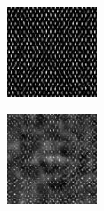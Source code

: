 \documentclass{article}
\begin{document}
\begin{figure}[h!]
\begin{subfigure}[b]{0.1\textwidth}
    \end{subfigure}
    \hspace{-1\baselineskip}
    \quad
    \begin{subfigure}[b]{0.1\textwidth}   
        \centering 
        \includegraphics[width=\textwidth]{plots/D_log_SE2_template.jpg}

    \end{subfigure}
    \hspace{-1\baselineskip}
    \quad
    \begin{subfigure}[b]{0.1\textwidth}   
        \centering 
        \includegraphics[width=\textwidth]{plots/E_log_SE2_template.jpg}


\end{subfigure}
\end{figure}
\end{document}
